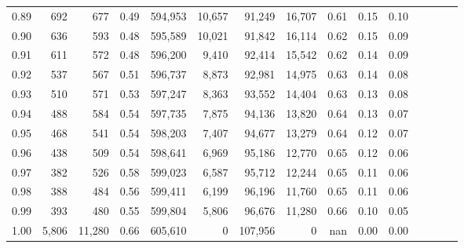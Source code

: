 \begin{tabular}{rrrcrrrrrrrrrrr}
0.89 &     692 &     677 &                                       0.49 &  594,953 &   10,657 &   91,249 &   16,707 &  0.61 &  0.15 &                         0.10 \\
0.90 &     636 &     593 &                                       0.48 &  595,589 &   10,021 &   91,842 &   16,114 &  0.62 &  0.15 &                         0.09 \\
0.91 &     611 &     572 &                                       0.48 &  596,200 &    9,410 &   92,414 &   15,542 &  0.62 &  0.14 &                         0.09 \\
0.92 &     537 &     567 &                                       0.51 &  596,737 &    8,873 &   92,981 &   14,975 &  0.63 &  0.14 &                         0.08 \\
0.93 &     510 &     571 &                                       0.53 &  597,247 &    8,363 &   93,552 &   14,404 &  0.63 &  0.13 &                         0.08 \\
0.94 &     488 &     584 &                                       0.54 &  597,735 &    7,875 &   94,136 &   13,820 &  0.64 &  0.13 &                         0.07 \\
0.95 &     468 &     541 &                                       0.54 &  598,203 &    7,407 &   94,677 &   13,279 &  0.64 &  0.12 &                         0.07 \\
0.96 &     438 &     509 &                                       0.54 &  598,641 &    6,969 &   95,186 &   12,770 &  0.65 &  0.12 &                         0.06 \\
0.97 &     382 &     526 &                                       0.58 &  599,023 &    6,587 &   95,712 &   12,244 &  0.65 &  0.11 &                         0.06 \\
0.98 &     388 &     484 &                                       0.56 &  599,411 &    6,199 &   96,196 &   11,760 &  0.65 &  0.11 &                         0.06 \\
0.99 &     393 &     480 &                                       0.55 &  599,804 &    5,806 &   96,676 &   11,280 &  0.66 &  0.10 &                         0.05 \\
1.00 &   5,806 &  11,280 &                                       0.66 &  605,610 &        0 &  107,956 &        0 &   nan &  0.00 &                         0.00 \\
\bottomrule
\end{tabular}
